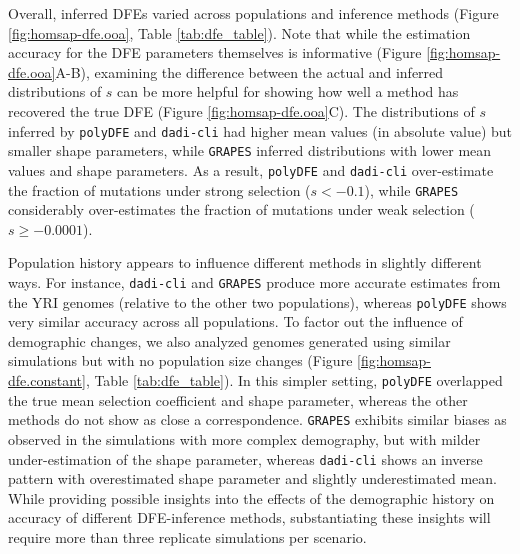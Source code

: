 \documentclass[hidelinks]{article}
\newcommand{\polydfe}{\texttt{polyDFE}\xspace}
\newcommand{\dadicli}{\texttt{dadi-cli}\xspace}
\newcommand{\grapes}{\texttt{GRAPES}\xspace}
\begin{document}
    Overall, inferred DFEs varied across populations and inference methods (Figure \ref{fig:homsap-dfe.ooa}, Table \ref{tab:dfe_table}).
    Note that while the estimation accuracy for the DFE parameters themselves is informative (Figure \ref{fig:homsap-dfe.ooa}A-B),
    examining the difference between the actual and inferred distributions of $s$ can be more helpful for showing how well a method
    has recovered the true DFE (Figure \ref{fig:homsap-dfe.ooa}C). 
    The distributions of $s$ inferred by \polydfe and \dadicli had higher mean values (in absolute value)
    but smaller shape parameters, while \grapes inferred distributions with lower mean values and shape parameters.
    As a result, \polydfe and \dadicli over-estimate the fraction of mutations under strong selection ($s<-0.1$),
    while \grapes considerably over-estimates the fraction of mutations under weak selection ($s\geq-0.0001$). 

    Population history appears to influence different methods in slightly different ways.
    For instance, \dadicli and \grapes produce more accurate estimates from the YRI genomes
    (relative to the other two populations), whereas \polydfe
    shows very similar accuracy across all populations.
    To factor out the influence of demographic changes, we also analyzed genomes generated using similar
    simulations but with no population size changes (Figure \ref{fig:homsap-dfe.constant}, Table \ref{tab:dfe_table}).
    In this simpler setting, \polydfe overlapped the true mean selection coefficient and shape parameter, whereas
    the other methods do not show as close a correspondence.
    \grapes exhibits similar biases as observed in the simulations with more complex demography,
    but with milder under-estimation of the shape parameter,
    whereas \dadicli shows an inverse pattern
    with overestimated shape parameter and slightly underestimated mean.
    While providing possible insights into the effects of the demographic history
    on accuracy of different DFE-inference methods, substantiating these insights
    will require more than three replicate simulations per scenario.
\end{document}
